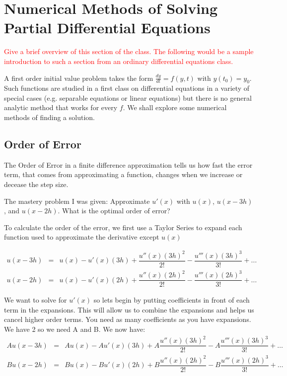 \documentclass{article}
\def\ds{\displaystyle}
\def\d#1#2{\frac{d#1}{d#2}} %
\newcommand{\bea}{\begin{eqnarray*}}
\newcommand{\eea}{\end{eqnarray*}}
\newcommand{\red}[1]{\textcolor{red}{#1}}
\newcommand{\blue}[1]{\textcolor{blue}{#1}}
\begin{document}
\section{Numerical Methods of Solving Partial Differential Equations}
\red{Give a brief overview of this section of the class. The following would be a sample introduction to such a section from an ordinary differential equations class.}

A first order initial value problem takes the form \(\ds \d{y}{t} = f(y,t)\) with \(\ds y(t_0)=y_0\). Such functions are studied in a first class on differential equations in a variety of special cases (e.g. separable equations or linear
equations) but there is no general analytic method that works for every \(f\). We shall explore some numerical methods of finding a solution.
\subsection{Order of Error}

The Order of Error in a finite difference approximation tells us how fast the error term, that comes from approximating a function, changes when we increase or decease the step size.\newline

The mastery problem I was given: Approximate $u'(x)$ with $u(x)$, $u(x-3h)$, and $u(x-2h)$. What is the optimal order of error? \newline

To calculate the order of the error, we first use a Taylor Series to expand each function used to approximate the derivative except $u(x)$

\bea
u(x-3h) &=& u(x) - u'(x)(3h) + \dfrac{u''(x)(3h)^2}{2!} -  \dfrac{u'''(x)(3h)^3}{3!}+\ldots \\
u(x-2h) &=& u(x) - u'(x)(2h) + \dfrac{u''(x)(2h)^2}{2!} - \dfrac{u'''(x)(2h)^3}{3!}+\ldots
\eea

We want to solve for $u'(x)$ so lets begin by putting coefficients in front of each term in the expansions. This will allow us to combine the expansions and helps us cancel higher order terms. You need as many coefficients as you have expansions. We have 2 so we need A and B.\newline
We now have: \newline
\bea
Au(x-3h) &=& Au(x) - Au'(x)(3h) + A\dfrac{u''(x)(3h)^2}{2!} -  A\dfrac{u'''(x)(3h)^3}{3!}+\ldots \\
Bu(x-2h) &=& Bu(x) - Bu'(x)(2h) + B\dfrac{u''(x)(2h)^2}{2!} - B\dfrac{u'''(x)(2h)^3}{3!}+\ldots
\eea
\end{document}
